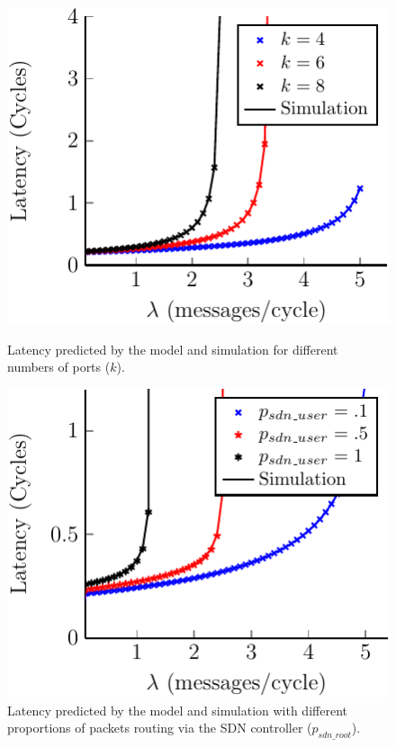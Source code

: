 \begin{figure}[bt]
\centering
\begin{minipage}[b]{.48\textwidth}
	\includegraphics[width=\linewidth]{graphs/num_ports-crop}
	\caption{Latency predicted by the model and simulation for different numbers
of ports ($k$).} 
	\label{fig:num_ports}
\end{minipage}
\hfill
\begin{minipage}[b]{.48\textwidth}
	\includegraphics[width=\linewidth]{graphs/diff_sdn-crop}
	\caption{Latency predicted by the model and simulation with different
proportions of packets routing via the SDN controller ($p_{sdn\_root}$).}
	\label{fig:sdn_perc}
\end{minipage}


\end{figure}

